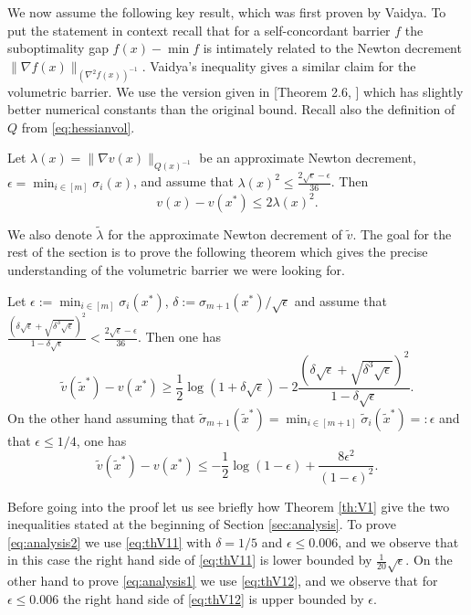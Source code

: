 We now assume the following key result, which was first proven by Vaidya. To put the statement in context recall that for a self-concordant barrier $f$ the suboptimality gap $f(x) - \min f$ is intimately related to the Newton decrement $\|\nabla f(x) \|_{(\nabla^2 f(x))^{-1}}$. Vaidya's inequality gives a similar claim for the volumetric barrier. We use the version given in [Theorem 2.6, \cite{Ans98}] which has slightly better numerical constants than the original bound. Recall also the definition of $Q$ from \eqref{eq:hessianvol}.

\begin{theorem} \label{th:V0}
Let $\lambda(x) = \|\nabla v(x) \|_{Q(x)^{-1}}$ be an approximate Newton decrement, $\epsilon = \min_{i \in [m]} \sigma_i(x)$, and assume that $\lambda(x)^2 \leq \frac{2 \sqrt{\epsilon} - \epsilon}{36}$. Then
$$v(x) - v(x^*) \leq 2 \lambda(x)^2 . $$
\end{theorem}
We also denote $\tilde{\lambda}$ for the approximate Newton decrement of $\tilde{v}$. The goal for the rest of the section is to prove the following theorem which gives the precise understanding of the volumetric barrier we were looking for.

\begin{theorem} \label{th:V1}
Let $\epsilon := \min_{i \in [m]} \sigma_i(x^*)$, $\delta := \sigma_{m+1}(x^*) / \sqrt{\epsilon}$ and assume that $\frac{\left(\delta \sqrt{\epsilon} + \sqrt{\delta^{3} \sqrt{\epsilon}}\right)^2}{1- \delta \sqrt{\epsilon}} < \frac{2 \sqrt{\epsilon} - \epsilon}{36}$. Then one has
\begin{equation} \label{eq:thV11}
\tilde{v}(\tilde{x}^*) - v(x^*) \geq \frac{1}{2} \log(1+\delta \sqrt{\epsilon}) - 2  \frac{\left(\delta \sqrt{\epsilon} + \sqrt{\delta^{3} \sqrt{\epsilon}}\right)^2}{1- \delta \sqrt{\epsilon}}  .
\end{equation}
On the other hand assuming that $\tilde{\sigma}_{m+1}(\tilde{x}^*) = \min_{i \in [m+1]} \tilde{\sigma}_{i}(\tilde{x}^*) =: \epsilon$ and that $\epsilon \leq 1/4$, one has 
\begin{equation} \label{eq:thV12}
\tilde{v}(\tilde{x}^*) - v(x^*) \leq - \frac{1}{2} \log(1 - \epsilon) + \frac{8 \epsilon^2}{(1-\epsilon)^2}.
\end{equation}
\end{theorem}

Before going into the proof let us see briefly how Theorem \ref{th:V1} give the two inequalities stated at the beginning of Section \ref{sec:analysis}. To prove \eqref{eq:analysis2} we use \eqref{eq:thV11} with $\delta=1/5$ and $\epsilon \leq 0.006$, and we observe that in this case the right hand side of \eqref{eq:thV11} is lower bounded by $\frac{1}{20} \sqrt{\epsilon}$. On the other hand to prove \eqref{eq:analysis1} we use \eqref{eq:thV12}, and we observe that for $\epsilon \leq 0.006$ the right hand side of \eqref{eq:thV12} is upper bounded by $\epsilon$.


